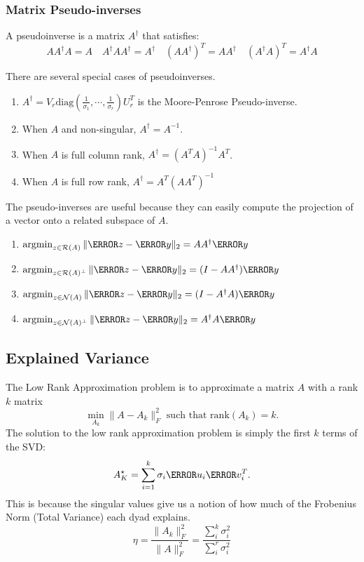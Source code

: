\subsubsection{Matrix Pseudo-inverses}
\begin{definition}
	A pseudoinverse is a matrix $A^{\dagger}$ that satisfies:
	\[
		A A^\dagger A = A \quad A^\dagger A A^\dagger = A^\dagger \quad (AA^\dagger)^T = A A^\dagger \quad (A^\dagger A)^T = A^\dagger A
	\]
	\label{defn:pseduoinverse}
\end{definition}
There are several special cases of pseudoinverses.
\begin{enumerate}
	\item $A^\dagger = V_r \text{diag}\left(\frac{1}{\sigma_1},\cdots,\frac{1}{\sigma_r}\right)U_r^T$ is the Moore-Penrose Pseudo-inverse.
	\item When $A$ and non-singular, $A^\dagger = A^{-1}$.
	\item When $A$ is full column rank, $A^\dagger = (A^TA)^{-1}A^T$.
	\item When $A$ is full row rank, $A^{\dagger} = A^T(AA^T)^{-1}$
\end{enumerate}
The pseudo-inverses are useful because they can easily compute the projection of a vector onto a related subspace of $A$.
\begin{enumerate}
	\item $\argmin_{z\in\mathcal{R}(A)}\|\V{z}-\V{y}\|_2 = AA^\dagger \V{y}$
	\item $\argmin_{z\in\mathcal{R}(A)^\perp}\|\V{z}-\V{y}\|_2 = (I - AA^\dagger)\V{y}$
	\item $\argmin_{z\in\mathcal{N}(A)}\|\V{z}-\V{y}\|_2 = (I - A^\dagger A)\V{y}$
	\item $\argmin_{z\in\mathcal{N}(A)^\perp}\|\V{z}-\V{y}\|_2 = A^\dagger A\V{y}$
\end{enumerate}
\subsection{Explained Variance}
The Low Rank Approximation problem is to approximate a matrix $A$ with a rank $k$ matrix
\[
	\min_{A_k} \|A - A_k\|_F^2 \text{ such that rank}(A_k) = k.
\]
The solution to the low rank approximation problem is simply the first $k$ terms of the SVD:
\[
	A_K^\star = \sum_{i=1}^k \sigma_i\V{u}_i\V{v}^T_i.
\]
This is because the singular values give us a notion of how much of the Frobenius Norm (Total Variance) each dyad explains.
\[
	\eta = \frac{\|A_k\|_F^2}{\|A\|_F^2} = \frac{\sum_i^k \sigma_i^2}{\sum_i^r \sigma_i^2}
\]
